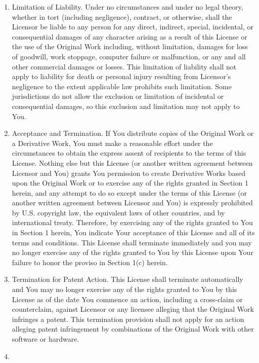 \begin{small}
\begin{enumerate}[1)]
part of this License. No license to Original Work is granted hereunder
except under this disclaimer.
\item
Limitation of Liability. Under no circumstances and under no legal
theory, whether in tort (including negligence), contract, or
otherwise, shall the Licensor be liable to any person for any direct,
indirect, special, incidental, or consequential damages of any
character arising as a result of this License or the use of the
Original Work including, without limitation, damages for loss of
goodwill, work stoppage, computer failure or malfunction, or any and
all other commercial damages or losses. This limitation of liability
shall not apply to liability for death or personal injury resulting
from Licensor's negligence to the extent applicable law prohibits such
limitation. Some jurisdictions do not allow the exclusion or
limitation of incidental or consequential damages, so this exclusion
and limitation may not apply to You.
\item
Acceptance and Termination. If You distribute copies of the Original
Work or a Derivative Work, You must make a reasonable effort under the
circumstances to obtain the express assent of recipients to the terms
of this License. Nothing else but this License (or another written
agreement between Licensor and You) grants You permission to create
Derivative Works based upon the Original Work or to exercise any of
the rights granted in Section 1 herein, and any attempt to do so
except under the terms of this License (or another written agreement
between Licensor and You) is expressly prohibited by U.S. copyright
law, the equivalent laws of other countries, and by international
treaty. Therefore, by exercising any of the rights granted to You in
Section 1 herein, You indicate Your acceptance of this License and all
of its terms and conditions. This License shall terminate immediately
and you may no longer exercise any of the rights granted to You by
this License upon Your failure to honor the proviso in Section 1(c)
herein.
\item
Termination for Patent Action. This License shall terminate
automatically and You may no longer exercise any of the rights granted
to You by this License as of the date You commence an action,
including a cross-claim or counterclaim, against Licensor or any
licensee alleging that the Original Work infringes a patent. This
termination provision shall not apply for an action alleging patent
infringement by combinations of the Original Work with other software
or hardware.
\item

\end{enumerate}
\end{small}
